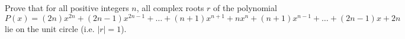 Prove that for all positive integers $n$, all complex roots $r$ of the polynomial
\[P(x) = (2n)x^{2n} + (2n-1)x^{2n-1} + \dots + (n+1)x^{n+1} + nx^n + (n+1)x^{n-1} + \dots + (2n-1)x + 2n\]lie on the unit circle (i.e. $|r| = 1$).